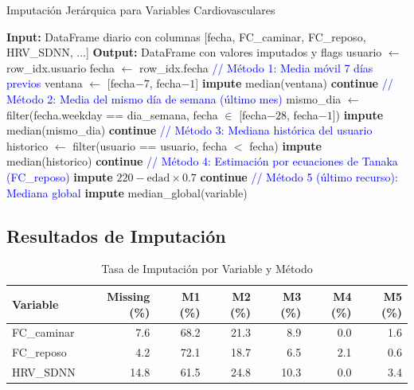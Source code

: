 \documentclass[12pt,letterpaper,twoside]{report}
\begin{document}
\begin{calculobox}
\begin{algorithm}[H]
\caption{Imputación Jerárquica para Variables Cardiovasculares}
\label{alg:hierarchical_imputation}
\begin{algorithmic}[1]
\State \textbf{Input:} DataFrame diario con columnas [fecha, FC\_caminar, FC\_reposo, HRV\_SDNN, ...]
\State \textbf{Output:} DataFrame con valores imputados y flags
\State
{}
        \State usuario $\gets$ row\_idx.usuario
        \State fecha $\gets$ row\_idx.fecha
        \State
        \State \textcolor{blue}{// Método 1: Media móvil 7 días previos}
        \State ventana $\gets$ [fecha$-7$, fecha$-1$]
            \State \textbf{impute} median(ventana) 
            \State \textbf{continue}
        \EndIf
        \State
        \State \textcolor{blue}{// Método 2: Media del mismo día de semana (último mes)}
        \State mismo\_dia $\gets$ filter(fecha.weekday == dia\_semana, fecha $\in$ [fecha$-28$, fecha$-1$])
            \State \textbf{impute} median(mismo\_dia)
            \State \textbf{continue}
        \EndIf
        \State
        \State \textcolor{blue}{// Método 3: Mediana histórica del usuario}
        \State historico $\gets$ filter(usuario == usuario, fecha $<$ fecha)
            \State \textbf{impute} median(historico)
            \State \textbf{continue}
        \EndIf
        \State
        \State \textcolor{blue}{// Método 4: Estimación por ecuaciones de Tanaka (FC\_reposo)}
            \State \textbf{impute} $220 - \text{edad} \times 0.7$ 
            \State \textbf{continue}
        \EndIf
        \State
        \State \textcolor{blue}{// Método 5 (último recurso): Mediana global}
        \State \textbf{impute} median\_global(variable)
    \EndFor
\EndFor
\end{algorithmic}
\end{algorithm}

\subsection{Resultados de Imputación}

\begin{table}[H]
\centering
\caption{Tasa de Imputación por Variable y Método}
\label{tab:imputation_rates}
\begin{tabular}{@{}lrrrrrr@{}}
\toprule
\textbf{Variable} & \textbf{Missing (\%)} & \textbf{M1 (\%)} & \textbf{M2 (\%)} & \textbf{M3 (\%)} & \textbf{M4 (\%)} & \textbf{M5 (\%)} \\
\midrule
FC\_caminar   & 7.6 & 68.2 & 21.3 & 8.9  & 0.0 & 1.6 \\
FC\_reposo    & 4.2 & 72.1 & 18.7 & 6.5  & 2.1 & 0.6 \\
HRV\_SDNN     & 14.8 & 61.5 & 24.8 & 10.3 & 0.0 & 3.4 \\
\bottomrule
\end{tabular}
\end{table}


\end{calculobox}
\end{document}
